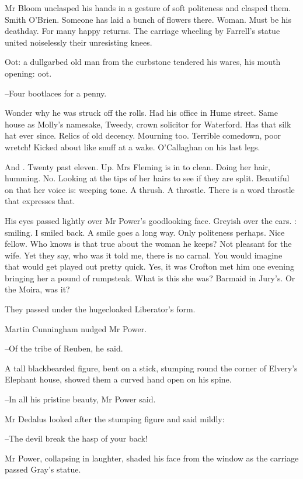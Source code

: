 Mr Bloom unclasped his hands in a gesture of soft politeness and clasped them.
Smith O'Brien.
Someone has laid a bunch of flowers there.
Woman.
Must be his deathday.
For many happy returns.
The carriage wheeling by Farrell's statue
united noiselessly their unresisting knees.

Oot:
a dullgarbed old man from the curbstone tendered his wares,
his mouth opening:
oot.

--Four bootlaces for a penny.

Wonder why he was struck off the rolls.
Had his office in Hume street.
Same house as Molly's namesake,
Tweedy, crown solicitor for Waterford.
Has that silk hat ever since.
Relics of old decency.
Mourning too.
Terrible comedown, poor wretch!
Kicked about like snuff at a wake.
O'Callaghan on his last legs.

And .
Twenty past eleven.
Up.
Mrs Fleming is in to clean.
Doing her hair, humming.
No.
Looking at the tips of her hairs to see if they are split.
Beautiful on that  her voice is:
weeping tone.
A thrush.
A throstle.
There is a word throstle that expresses that.

His eyes passed lightly over Mr Power's goodlooking face.
Greyish over the ears.
:
smiling.
I smiled back.
A smile goes a long way.
Only politeness perhaps.
Nice fellow.
Who knows is that true about the woman he keeps?
Not pleasant for the wife.
Yet they say,
who was it told me,
there is no carnal.
You would imagine that would get played out pretty quick.
Yes, it was Crofton met him one evening
bringing her a pound of rumpsteak.
What is this she was?
Barmaid in Jury's.
Or the Moira, was it?

They passed under the hugecloaked Liberator's form.

Martin Cunningham nudged Mr Power.

--Of the tribe of Reuben,
he said.

A tall blackbearded figure, bent on a stick,
stumping round the corner of Elvery's Elephant house,
showed them a curved hand open on his spine.

--In all his pristine beauty,
Mr Power said.

Mr Dedalus looked after the stumping figure and said mildly:

--The devil break the hasp of your back!

Mr Power, collapsing in laughter,
shaded his face from the window as the carriage passed Gray's statue.

